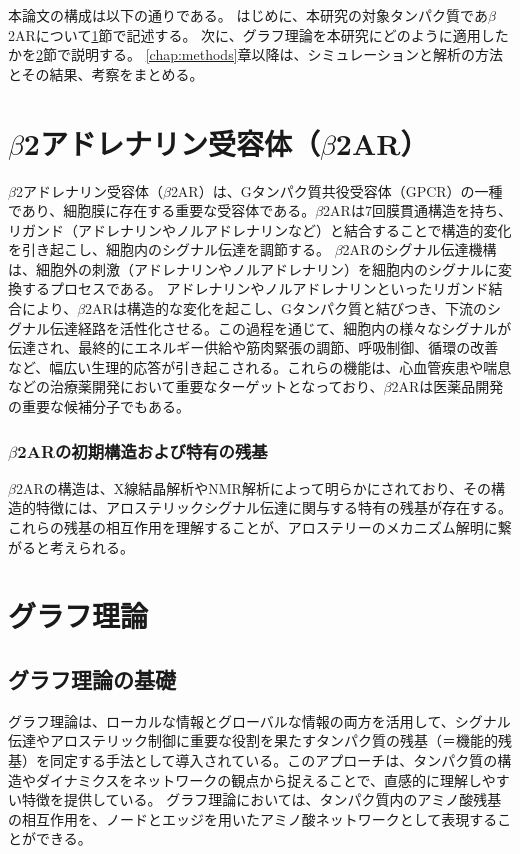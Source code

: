 本論文の構成は以下の通りである。
はじめに、本研究の対象タンパク質であ$\beta$2ARについて\ref{sec:b2ar}節で記述する。
次に、グラフ理論を本研究にどのように適用したかを\ref{sec:graph theory}節で説明する。
\ref{chap:methods}章以降は、シミュレーションと解析の方法とその結果、考察をまとめる。

\newpage

\section{$\beta$2アドレナリン受容体（$\beta$2AR）}\label{sec:b2ar}
$\beta$2アドレナリン受容体（$\beta$2AR）は、Gタンパク質共役受容体（GPCR）の一種であり、細胞膜に存在する重要な受容体である。$\beta$2ARは7回膜貫通構造を持ち、リガンド（アドレナリンやノルアドレナリンなど）と結合することで構造的変化を引き起こし、細胞内のシグナル伝達を調節する。
$\beta$2ARのシグナル伝達機構は、細胞外の刺激（アドレナリンやノルアドレナリン）を細胞内のシグナルに変換するプロセスである。
アドレナリンやノルアドレナリンといったリガンド結合により、$\beta$2ARは構造的な変化を起こし、Gタンパク質と結びつき、下流のシグナル伝達経路を活性化させる。この過程を通じて、細胞内の様々なシグナルが伝達され、最終的にエネルギー供給や筋肉緊張の調節、呼吸制御、循環の改善など、幅広い生理的応答が引き起こされる。これらの機能は、心血管疾患や喘息などの治療薬開発において重要なターゲットとなっており、$\beta$2ARは医薬品開発の重要な候補分子でもある。

\subsubsection*{$\beta$2ARの初期構造および特有の残基} 
$\beta$2ARの構造は、X線結晶解析やNMR解析によって明らかにされており、その構造的特徴には、アロステリックシグナル伝達に関与する特有の残基が存在する。これらの残基の相互作用を理解することが、アロステリーのメカニズム解明に繋がると考えられる。

\section{グラフ理論}\label{sec:graph theory}

\subsection*{グラフ理論の基礎}

グラフ理論は、ローカルな情報とグローバルな情報の両方を活用して、シグナル伝達やアロステリック制御に重要な役割を果たすタンパク質の残基（＝機能的残基）を同定する手法として導入されている。このアプローチは、タンパク質の構造やダイナミクスをネットワークの観点から捉えることで、直感的に理解しやすい特徴を提供している。
グラフ理論においては、タンパク質内のアミノ酸残基の相互作用を、ノードとエッジを用いたアミノ酸ネットワークとして表現することができる。

